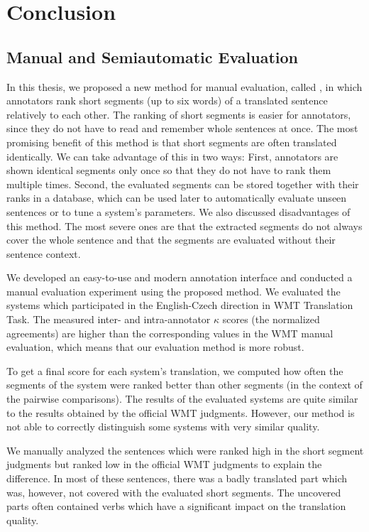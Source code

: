 \chapter{Conclusion}
\label{chapter:conclusion}

\section{Manual and Semiautomatic Evaluation}

In this thesis, we proposed a new method for manual evaluation, called
, in which annotators rank short segments (up to six words) of
a translated sentence relatively to each other. The ranking of short segments
is easier for annotators, since they do not have to read and remember whole
sentences at once. The most promising benefit of this method is that short
segments are often translated identically.  We can take advantage of this in
two ways: First, annotators are shown identical segments only once so that they
do not have to rank them multiple times. Second, the evaluated segments can be
stored together with their ranks in a database, which can be used later to
automatically evaluate unseen sentences or to tune a system's parameters. We
also discussed disadvantages of this method. The most severe ones are that the
extracted segments do not always cover the whole sentence and that the segments
are evaluated without their sentence context.

We developed an easy-to-use and modern annotation interface and conducted a
manual evaluation experiment using the proposed method. We evaluated the
systems which participated in the English-Czech direction in WMT Translation
Task. The measured inter- and intra-annotator $\kappa$ scores (the
normalized agreements) are higher than the corresponding values in the WMT
manual evaluation, which means that our evaluation method is more robust.

To get a final score for each system's translation, we computed how often the
segments of the system were ranked better than other segments (in the context
of the pairwise comparisons). The results of the evaluated systems are quite
similar to the results obtained by the official WMT judgments. However, our
method is not able to correctly distinguish some systems with very similar
quality.
\begin{comment}
The Pearson correlation coefficient between the short segments scores
and the official human scores is 0.978, which is lower than correlations of
some of the best performing automatic metrics (\metric{NIST}, \metric{CDER},
\metric{ELEXR}).
\end{comment}
We manually analyzed the sentences which were ranked high in
the short segment judgments but ranked low in the official WMT judgments to
explain the difference. In most of these sentences, there was a badly
translated part which was, however, not covered with the evaluated short
segments.  The uncovered parts often contained verbs which have a significant
impact on the translation quality. 

